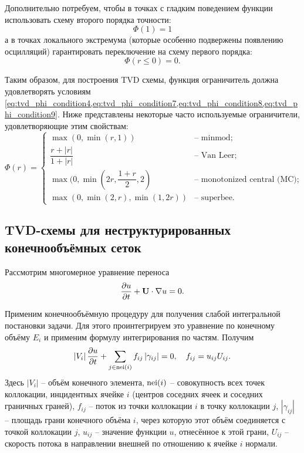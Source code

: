 Дополнительно потребуем, чтобы в точках с гладким поведением функции использовать схему второго порядка точности:
\begin{equation}
\label{eq:tvd_phi_condition8}
\Phi(1) = 1
\end{equation}
а в точках локального экстремума (которые особенно подвержены появлению осцилляций) гарантировать переключение на схему первого порядка:
\begin{equation}
\label{eq:tvd_phi_condition9}
\Phi(r\leq0) = 0.
\end{equation}

Таким образом, для построения TVD схемы, функция ограничитель должна удовлетворять условиям
\cref{eq:tvd_phi_condition4,eq:tvd_phi_condition7,eq:tvd_phi_condition8,eq:tvd_phi_condition9}.
Ниже представлены некоторые часто используемые ограничители, удовлетворяющие этим свойствам:
\begin{equation}
\label{eq:tvd_limiter}
\Phi(r) = \left\{
\begin{array}{ll}
\max(0, \min(r, 1))                   & \text{-- minmod};\\[10pt]
\dfrac{r + |r|}{1+|r|}                & \text{-- Van Leer}; \\[10pt]
\max(0, \min(2r, \dfrac{1+r}{2}, 2)   & \text{-- monotonized central (MC)}; \\[10pt]
\max(0, \min(2, r), \min(1, 2 r))     & \text{-- superbee}.
\end{array}
\right.
\end{equation}

\subsection{TVD-схемы для неструктурированных конечнообъёмных сеток}
\label{sec:tvd_fvm}
Рассмотрим многомерное уравнение переноса
\begin{equation}
\nonumber
\frac{\partial u}{\partial t} + \boldsymbol{\rm U} \cdot \nabla u = 0.
\end{equation}

Применим конечнообъёмную процедуру
для получения слабой интегральной постановки задачи.
Для этого проинтегрируем это уравнение
по конечному объёму $E_i$ 
и применим формулу интегрирования по частям.
Получим
\begin{equation}
\label{eq:tvd_fvm_transport}
\left| V_i \right|
\frac{\partial u}{\partial t}
+ \sum_{j\in {\rm nei}(i)} {f_{ij} \left|\gamma_{ij}\right|}
= 0, \quad f_{ij} = u_{ij} U_{ij}.
\end{equation}
Здесь $|V_i|$ -- объём конечного элемента,
${\rm nei}(i)$ -- совокупность
всех точек коллокации, инцидентных ячейке $i$
(центров соседних ячеек и соседних граничных граней),
$f_{ij}$ -- поток из точки коллокации $i$ в точку коллокации $j$,
$|\gamma_{ij}|$ --
площадь грани
конечного объёма $i$, через
которую этот объём соединяется с точкой коллокации $j$,
$u_{ij}$ -- значение функции $u$, отнесённое к этой грани,
$U_{ij}$ -- скорость потока в направлении внешней по отношению
к ячейке $i$ нормали.

